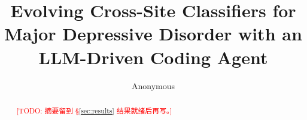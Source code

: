 \documentclass{article}
\title{Evolving Cross-Site Classifiers for Major Depressive Disorder
with an LLM-Driven Coding Agent}
\author{Anonymous}
\newcommand{\todo}[1]{\textcolor{red}{[TODO: #1]}}
\begin{document}
\maketitle

\begin{abstract}
\todo{摘要留到 §\ref{sec:results} 结果就绪后再写。}
\end{abstract}










\end{document}

